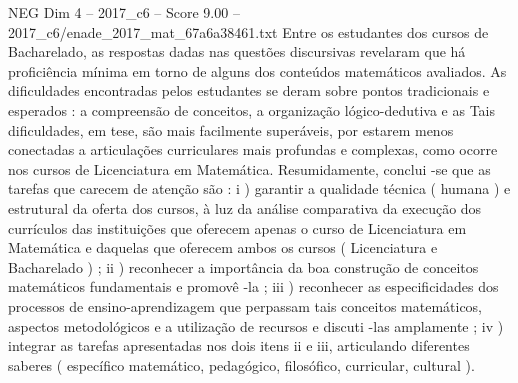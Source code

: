 \begin{textsample}{NEG Dim 4 – 2017\_c6 – Score 9.00 – 2017\_c6/enade\_2017\_mat\_67a6a38461.txt}
Entre os estudantes dos cursos de Bacharelado, as respostas dadas nas questões discursivas revelaram que há proficiência mínima em torno de alguns dos conteúdos matemáticos avaliados.
As dificuldades encontradas pelos estudantes se deram sobre pontos tradicionais e esperados : a compreensão de conceitos, a organização lógico-dedutiva e as Tais dificuldades, em tese, são mais facilmente superáveis, por estarem menos conectadas a articulações curriculares mais profundas e complexas, como ocorre nos cursos de Licenciatura em Matemática.
Resumidamente, conclui -se que as tarefas que carecem de atenção são : i ) garantir a qualidade técnica ( humana ) e estrutural da oferta dos cursos, à luz da análise comparativa da execução dos currículos das instituições que oferecem apenas o curso de Licenciatura em Matemática e daquelas que oferecem ambos os cursos ( Licenciatura e Bacharelado ) ; ii ) reconhecer a importância da boa construção de conceitos matemáticos fundamentais e promovê -la ; iii ) reconhecer as especificidades dos processos de ensino-aprendizagem que perpassam tais conceitos matemáticos, aspectos metodológicos e a utilização de recursos e discuti -las amplamente ; iv ) integrar as tarefas apresentadas nos dois itens ii e iii, articulando diferentes saberes ( específico matemático, pedagógico, filosófico, curricular, cultural ).

\end{textsample}

